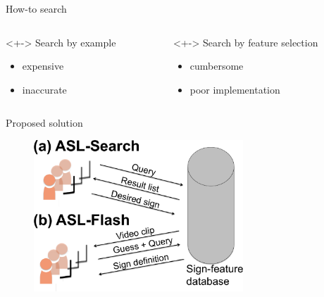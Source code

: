 	\begin{frame}{How-to search}
		\centering
		\begin{columns}
			\begin{column}{0.4\textwidth}<+->
				Search by example
				\begin{itemize}
					\item expensive
					\item inaccurate
				\end{itemize}
			\end{column}

			\begin{column}{0.5\textwidth}<+->
				Search by feature selection
				\begin{itemize}
					\item cumbersome
					\item poor implementation
				\end{itemize}
			\end{column}
		\end{columns}
	\end{frame}


	\begin{frame}{Proposed solution}
		\begin{figure}
			\centering
			\includegraphics[width=0.7\textwidth]{images/ASL-overview}
		\end{figure}
	\end{frame}


